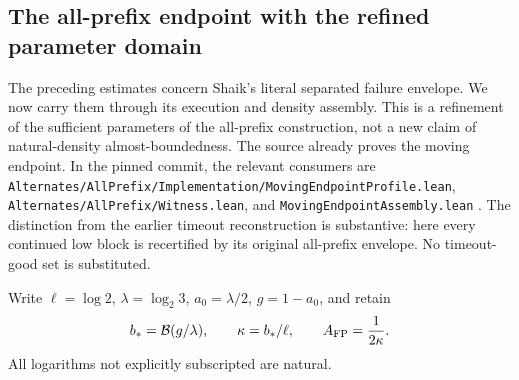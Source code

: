 \documentclass[11pt]{article}
\theoremstyle{remark}\newtheorem{remark}[proposition]{Remark}
\begin{document}
\subsection{The all-prefix endpoint with the refined parameter domain}

The preceding estimates concern Shaik's literal separated failure envelope.
We now carry them through its execution and density assembly. This is a
refinement of the sufficient parameters of the all-prefix construction,
not a new claim of natural-density almost-boundedness. The source already
proves the moving endpoint. In the pinned commit, the relevant consumers
are \texttt{Alternates/AllPrefix/Implementation/MovingEndpointProfile.lean},
\texttt{Alternates/AllPrefix/Witness.lean}, and
\texttt{MovingEndpointAssembly.lean} \cite{Shaik2026v324}.
The distinction from the earlier timeout reconstruction is substantive:
here every continued low block is recertified by its original all-prefix
envelope. No timeout-good set is substituted.

Write \(\ell=\log2\), \(\lambda=\log_2 3\), \(a_0=\lambda/2\),
\(g=1-a_0\), and retain
\[
 b_*=\mathcal B(g/\lambda),\qquad \kappa=b_*/\ell,\qquad
 A_{\rm FP}=\frac1{2\kappa}.
\]
All logarithms not explicitly subscripted are natural.
\end{document}
